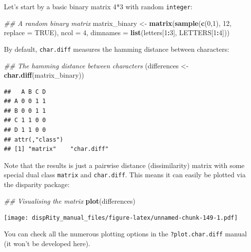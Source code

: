 \documentclass[
]{book}
\newenvironment{Shaded}{\begin{snugshade}}{\end{snugshade}}
\newcommand{\CommentTok}[1]{\textcolor[rgb]{0.56,0.35,0.01}{\textit{#1}}}
\newcommand{\DataTypeTok}[1]{\textcolor[rgb]{0.13,0.29,0.53}{#1}}
\newcommand{\DecValTok}[1]{\textcolor[rgb]{0.00,0.00,0.81}{#1}}
\newcommand{\KeywordTok}[1]{\textcolor[rgb]{0.13,0.29,0.53}{\textbf{#1}}}
\newcommand{\NormalTok}[1]{#1}
\newcommand{\OperatorTok}[1]{\textcolor[rgb]{0.81,0.36,0.00}{\textbf{#1}}}
\newcommand{\OtherTok}[1]{\textcolor[rgb]{0.56,0.35,0.01}{#1}}
\newcommand{\StringTok}[1]{\textcolor[rgb]{0.31,0.60,0.02}{#1}}
\begin{document}
Let's start by a basic binary matrix 4*3 with random \texttt{integer}:

\begin{Shaded}
\begin{Highlighting}[]
\CommentTok{\#\# A random binary matrix}
\NormalTok{matrix\_binary \textless{}{-}}\StringTok{ }\KeywordTok{matrix}\NormalTok{(}\KeywordTok{sample}\NormalTok{(}\KeywordTok{c}\NormalTok{(}\DecValTok{0}\NormalTok{,}\DecValTok{1}\NormalTok{), }\DecValTok{12}\NormalTok{, }\DataTypeTok{replace =} \OtherTok{TRUE}\NormalTok{), }\DataTypeTok{ncol =} \DecValTok{4}\NormalTok{,}
                        \DataTypeTok{dimnames =} \KeywordTok{list}\NormalTok{(letters[}\DecValTok{1}\OperatorTok{:}\DecValTok{3}\NormalTok{], LETTERS[}\DecValTok{1}\OperatorTok{:}\DecValTok{4}\NormalTok{]))}
\end{Highlighting}
\end{Shaded}

By default, \texttt{char.diff} measures the hamming distance between characters:

\begin{Shaded}
\begin{Highlighting}[]
\CommentTok{\#\# The hamming distance between characters}
\NormalTok{(differences \textless{}{-}}\StringTok{ }\KeywordTok{char.diff}\NormalTok{(matrix\_binary))}
\end{Highlighting}
\end{Shaded}

\begin{verbatim}
##   A B C D
## A 0 0 1 1
## B 0 0 1 1
## C 1 1 0 0
## D 1 1 0 0
## attr(,"class")
## [1] "matrix"    "char.diff"
\end{verbatim}

Note that the results is just a pairwise distance (dissimilarity) matrix with some special dual class \texttt{matrix} and \texttt{char.diff}.
This means it can easily be plotted via the disparity package:

\begin{Shaded}
\begin{Highlighting}[]
\CommentTok{\#\# Visualising the matrix}
\KeywordTok{plot}\NormalTok{(differences)}
\end{Highlighting}
\end{Shaded}

\texttt{[image: dispRity\_manual\_files/figure-latex/unnamed-chunk-149-1.pdf]}

You can check all the numerous plotting options in the \texttt{?plot.char.diff} manual (it won't be developed here).
\end{document}
